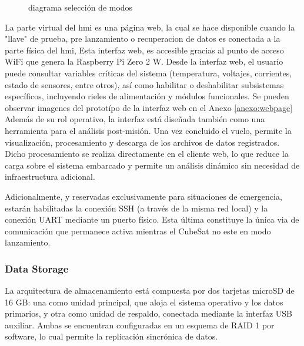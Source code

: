 \begin{figure}[H]
{
        }
        \caption{diagrama selección de modos}
        \label{fig:seleccion_modos}
      \end{figure}

      La parte virtual del \acrshort{hmi} es una página web, la cual se hace disponible cuando la "llave" de prueba, pre
      lanzamiento o recuperacion de datos es conectada a la parte física del \acrshort{hmi}, Esta interfaz web, es
      accesible gracias al punto de acceso WiFi que genera la Raspberry Pi Zero 2 W. Desde la interfaz web, el usuario
      puede consultar variables críticas del sistema (temperatura, voltajes, corrientes, estado de sensores, entre
      otros), así como habilitar o deshabilitar subsistemas específicos, incluyendo rieles de alimentación y módulos
      funcionales. Se pueden observar imagenes del prototípo de la interfaz web en el Anexo \ref{anexo:webpage} Además
      de su rol operativo, la interfaz está diseñada también como una herramienta para el análisis post-misión. Una vez
      concluido el vuelo, permite la visualización, procesamiento y descarga de los archivos de datos registrados. Dicho
      procesamiento se realiza directamente en el cliente web, lo que reduce la carga sobre el sistema embarcado y
      permite un análisis dinámico sin necesidad de infraestructura adicional.

      Adicionalmente, y reservadas exclusivamente para situaciones de emergencia, estarán habilitadas la conexión
      SSH (a través de la misma red local) y la conexión UART mediante un puerto físico. Esta última constituye la
      única via de comunicación que permanece activa mientras el CubeSat no este en modo lanzamiento.

  \subsubsection{Data Storage}
    La arquitectura de almacenamiento está compuesta por dos tarjetas microSD de 16 GB:
    una como unidad principal, que aloja el sistema operativo y los datos primarios, y otra como unidad de respaldo,
    conectada mediante la interfaz USB auxiliar. Ambas se encuentran configuradas en un esquema de RAID 1 por
    software, lo cual permite la replicación sincrónica de datos.

